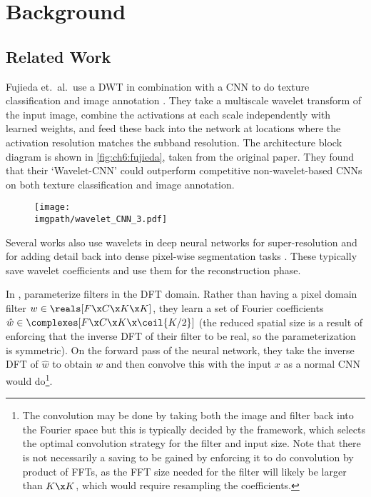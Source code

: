 \section{Background}\label{sec:ch6:background}
\subsection{Related Work}\label{sec:ch6:related} 
Fujieda et.\ al.\ use a DWT in combination with a
CNN to do texture classification and image annotation 
\cite{fujieda_wavelet_2017, fujieda_wavelet_2018}. They take a
multiscale wavelet transform of the input image, combine the activations at each
scale independently with learned weights, and feed these back into the network
at locations where the activation resolution matches the subband resolution. The
architecture block diagram is shown in \autoref{fig:ch6:fujieda}, taken from the
original paper. They found that their `Wavelet-CNN' could
outperform competitive non-wavelet-based CNNs on both texture classification and
image annotation.

\begin{figure}[bt]
  \centering
  \texttt{[image: \\imgpath/wavelet\_CNN\_3.pdf]}
  \label{fig:ch6:fujieda}
\end{figure}

Several works also use wavelets in deep neural networks for super-resolution
\cite{guo_deep_2017} and for adding detail back into dense pixel-wise
segmentation tasks \cite{ma_detailed_2018}. These typically save wavelet
coefficients and use them for the reconstruction phase.

In \cite{rippel_spectral_2015}, \citeauthor{rippel_spectral_2015}
parameterize filters in the DFT domain. Rather than having a pixel domain filter
$w \in \reals[F\x C\x K\x K]$, they learn a set of Fourier coefficients
$\hat{w} \in \complexes[F\x C\x K \x \ceil{K/2}]$
(the reduced spatial size is a result of enforcing that the inverse DFT of their
filter to be real, so the parameterization is symmetric). On the forward pass of
the neural network, they take the inverse DFT of $\hat{w}$ to obtain
$w$ and then convolve this with the input $x$ as a normal CNN
would do\footnote{The convolution may be done by taking both the image and
filter back into the Fourier space but this is typically decided by the
framework, which selects the optimal convolution strategy for the filter and
input size. Note that there is not necessarily a saving to be gained by
enforcing it to do convolution by product of FFTs, as the FFT size needed for
the filter will likely be larger than $K\x K$, which would require resampling
the coefficients.}. 

